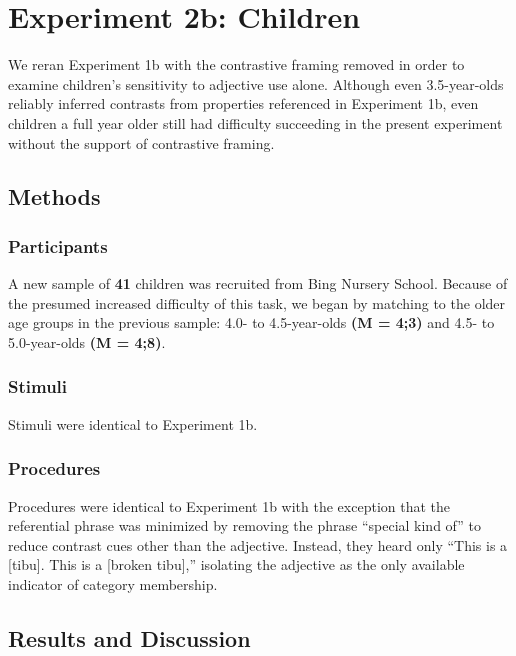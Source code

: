 \documentclass[10pt,letterpaper]{article}
\begin{document}
\section{Experiment 2b: Children} 

We reran Experiment 1b with the contrastive framing removed in order to examine children's sensitivity to adjective use alone. Although even 3.5-year-olds reliably inferred contrasts from properties referenced in Experiment 1b, even children a full year older still had difficulty succeeding in the present experiment without the support of contrastive framing.  

\subsection{Methods}

\subsubsection{Participants}

A new sample of \textbf{41} children was recruited from Bing Nursery School.  Because of the presumed increased difficulty of this task, we began by matching to the older age groups in the previous sample: 4.0- to 4.5-year-olds \textbf{(M = 4;3)} and 4.5- to 5.0-year-olds \textbf{(M = 4;8)}.

\subsubsection{Stimuli}

Stimuli were identical to Experiment 1b. 

\subsubsection{Procedures}

Procedures were identical to Experiment 1b with the exception that the referential phrase was minimized by removing the phrase ``special kind of'' to reduce contrast cues other than the adjective.  Instead, they heard only ``This is a [tibu]. This is a [broken tibu],'' isolating the adjective as the only available indicator of category membership.

\subsection{Results and Discussion}
\end{document}
